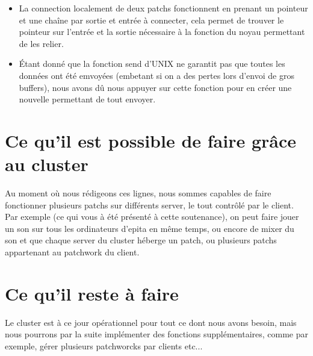 \begin{itemize}
  \newpage

\item La connection localement de deux patchs fonctionnent en prenant un pointeur et une cha\^ine par sortie et entr\'ee \`a connecter, cela permet de trouver le pointeur sur l'entr\'ee et la sortie n\'ecessaire \`a la fonction du noyau permettant de les relier. 
  \newline
\item \'Etant donn\'e que la fonction send d'UNIX ne garantit pas que toutes les
 donn\'ees ont \'et\'e emvoy\'ees (embetant si on a des pertes lors d'envoi de 
gros buffers), nous avons d\^u nous appuyer sur cette fonction pour en cr\'eer 
une nouvelle permettant de tout envoyer.

\end{itemize}



\section{Ce qu'il est possible de faire gr\^ace au cluster}
Au moment o\`u nous r\'edigeons ces lignes, nous sommes capables de faire 
fonctionner plusieurs patchs sur diff\'erents server, le tout contr\^ol\'e 
par le client.
Par exemple (ce qui vous \`a \'et\'e pr\'esent\'e \`a cette soutenance),
on peut faire jouer un son sur tous les ordinateurs d'epita en m\^eme temps, 
ou encore de mixer du son et que chaque server du cluster h\'eberge un patch, 
ou plusieurs patchs appartenant au patchwork du client. 

\section{Ce qu'il reste \`a faire}
Le cluster est \`a ce jour op\'erationnel pour tout ce dont nous avons besoin, 
mais nous pourrons par la suite impl\'ementer des fonctions suppl\'ementaires, 
comme par exemple, g\'erer plusieurs patchworcks par clients etc...